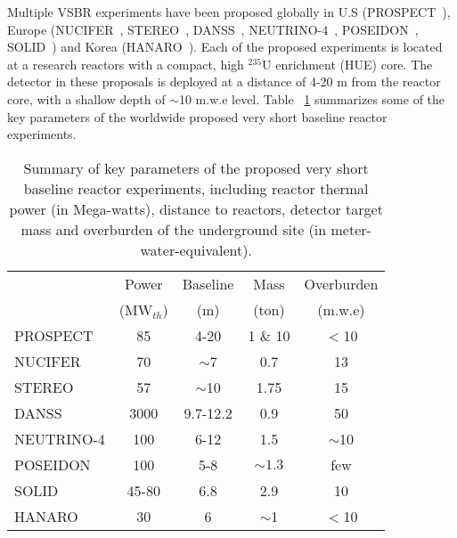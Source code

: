 Multiple VSBR experiments have been proposed globally in U.S (PROSPECT~\cite{PROSPECT}), Europe (NUCIFER~\cite{NUCIFER-2010, NUCIFER-2014}, STEREO~\cite{NUCIFER-2014}, DANSS~\cite{DANSS}, NEUTRINO-4~\cite{NEUTRINO4-2012,NEUTRINO4-2014}, POSEIDON~\cite{POSEIDON}, SOLID~\cite{SoLid}) and Korea (HANARO~\cite{HANARO}). Each of the proposed experiments is located at a research reactors with a compact, high $^{235}$U enrichment (HUE) core. The detector in these proposals is deployed at a distance of 4-20 m from the reactor core, with a shallow depth of $\sim$10 m.w.e level. Table ~\ref{tab:sterile} summarizes some of the key parameters of the worldwide proposed very short baseline reactor experiments.

\begin{table}[t]
  \begin{tabular}{lcccc}
  \hline
  & Power & Baseline & Mass & Overburden \\
  & (MW$_{th}$) & (m) & (ton) & (m.w.e)    \\
  \hline
  PROSPECT  & 85  & 4-20 & 1 \& 10     & $<$10 \\
  NUCIFER   & 70 & $\sim$7  & 0.7 & 13\\
  STEREO & 57  & $\sim$10 & 1.75  & 15\\
  DANSS & 3000  & 9.7-12.2  & 0.9  & 50\\
  NEUTRINO-4 & 100  & 6-12  & 1.5  & $\sim$10 \\
  POSEIDON & 100  & 5-8  & $\sim1.3$ & few\\
  SOLID & 45-80 & 6.8  & 2.9  & 10\\
  HANARO & 30  & 6  & $\sim$1  & $<$10\\
  \hline
  \end{tabular}
  \caption{Summary of key parameters of the proposed very short baseline reactor experiments, including reactor thermal power (in Mega-watts), distance to reactors, detector target mass and overburden of the underground site (in meter-water-equivalent).}
\label{tab:sterile}
\end{table}

